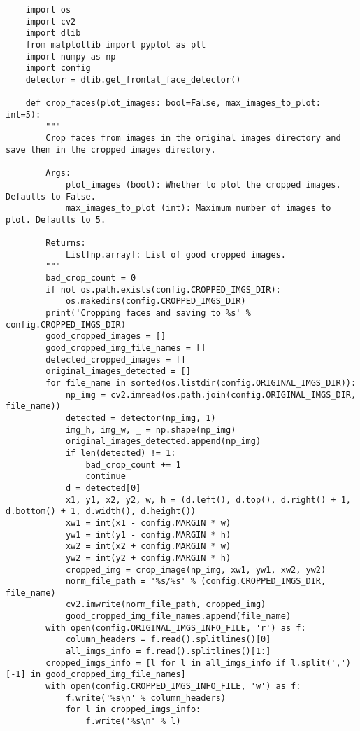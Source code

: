 \begin{verbatim}
    import os
    import cv2
    import dlib
    from matplotlib import pyplot as plt
    import numpy as np
    import config
    detector = dlib.get_frontal_face_detector()
    
    def crop_faces(plot_images: bool=False, max_images_to_plot: int=5):
        """
        Crop faces from images in the original images directory and save them in the cropped images directory.
    
        Args: 
            plot_images (bool): Whether to plot the cropped images. Defaults to False.
            max_images_to_plot (int): Maximum number of images to plot. Defaults to 5.
        
        Returns:
            List[np.array]: List of good cropped images.
        """
        bad_crop_count = 0
        if not os.path.exists(config.CROPPED_IMGS_DIR):
            os.makedirs(config.CROPPED_IMGS_DIR)
        print('Cropping faces and saving to %s' % config.CROPPED_IMGS_DIR)
        good_cropped_images = []
        good_cropped_img_file_names = []
        detected_cropped_images = []
        original_images_detected = []
        for file_name in sorted(os.listdir(config.ORIGINAL_IMGS_DIR)):
            np_img = cv2.imread(os.path.join(config.ORIGINAL_IMGS_DIR, file_name))
            detected = detector(np_img, 1)
            img_h, img_w, _ = np.shape(np_img)
            original_images_detected.append(np_img)
            if len(detected) != 1:
                bad_crop_count += 1
                continue
            d = detected[0]
            x1, y1, x2, y2, w, h = (d.left(), d.top(), d.right() + 1, d.bottom() + 1, d.width(), d.height())
            xw1 = int(x1 - config.MARGIN * w)
            yw1 = int(y1 - config.MARGIN * h)
            xw2 = int(x2 + config.MARGIN * w)
            yw2 = int(y2 + config.MARGIN * h)
            cropped_img = crop_image(np_img, xw1, yw1, xw2, yw2)
            norm_file_path = '%s/%s' % (config.CROPPED_IMGS_DIR, file_name)
            cv2.imwrite(norm_file_path, cropped_img)
            good_cropped_img_file_names.append(file_name)
        with open(config.ORIGINAL_IMGS_INFO_FILE, 'r') as f:
            column_headers = f.read().splitlines()[0]
            all_imgs_info = f.read().splitlines()[1:]
        cropped_imgs_info = [l for l in all_imgs_info if l.split(',')[-1] in good_cropped_img_file_names]
        with open(config.CROPPED_IMGS_INFO_FILE, 'w') as f:
            f.write('%s\n' % column_headers)
            for l in cropped_imgs_info:
                f.write('%s\n' % l)

\end{verbatim}
